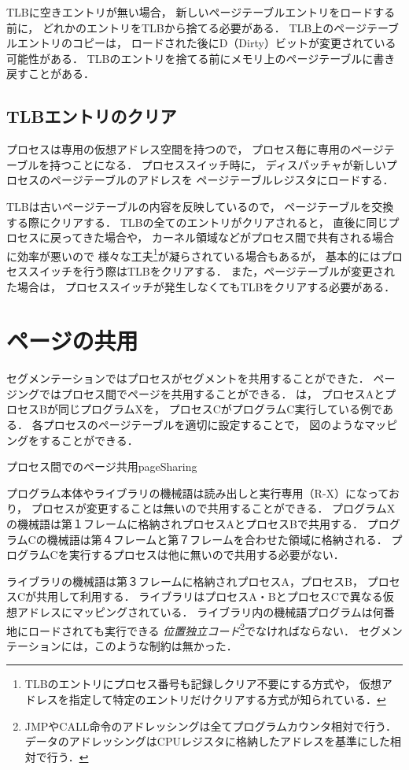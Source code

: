 TLBに空きエントリが無い場合，
新しいページテーブルエントリをロードする前に，
どれかのエントリをTLBから捨てる必要がある．
TLB上のページテーブルエントリのコピーは，
ロードされた後にD（Dirty）ビットが変更されている可能性がある．
TLBのエントリを捨てる前にメモリ上のページテーブルに書き戻すことがある．

\subsection{TLBエントリのクリア}
プロセスは専用の仮想アドレス空間を持つので，
プロセス毎に専用のページテーブルを持つことになる．
プロセススイッチ時に，
ディスパッチャが新しいプロセスのページテーブルのアドレスを
ページテーブルレジスタにロードする．

TLBは古いページテーブルの内容を反映しているので，
ページテーブルを交換する際にクリアする．
TLBの全てのエントリがクリアされると，
直後に同じプロセスに戻ってきた場合や，
カーネル領域などがプロセス間で共有される場合に効率が悪いので
様々な工夫\footnote{
TLBのエントリにプロセス番号も記録しクリア不要にする方式や，
仮想アドレスを指定して特定のエントリだけクリアする方式が知られている．
}が凝らされている場合もあるが，
基本的にはプロセススイッチを行う際はTLBをクリアする．
また，ページテーブルが変更された場合は，
プロセススイッチが発生しなくてもTLBをクリアする必要がある．

\section{ページの共用}
セグメンテーションではプロセスがセグメントを共用することができた．
ページングではプロセス間でページを共用することができる．
は，
プロセスAとプロセスBが同じプログラムXを，
プロセスCがプログラムC実行している例である．
各プロセスのページテーブルを適切に設定することで，
図のようなマッピングをすることができる．

{プロセス間でのページ共用}{pageSharing}

プログラム本体やライブラリの機械語は読み出しと実行専用（R-X）になっており，
プロセスが変更することは無いので共用することができる．
プログラムXの機械語は第１フレームに格納されプロセスAとプロセスBで共用する．
プログラムCの機械語は第４フレームと第７フレームを合わせた領域に格納される．
プログラムCを実行するプロセスは他に無いので共用する必要がない．

ライブラリの機械語は第３フレームに格納されプロセスA，プロセスB，
プロセスCが共用して利用する．
ライブラリはプロセスA・BとプロセスCで異なる仮想アドレスにマッピングされている．
ライブラリ内の機械語プログラムは何番地にロードされても実行できる
\emph{位置独立コード}\footnote{
JMPやCALL命令のアドレッシングは全てプログラムカウンタ相対で行う．
データのアドレッシングはCPUレジスタに格納したアドレスを基準にした相対で行う．
}でなければならない．
セグメンテーションには，このような制約は無かった．

